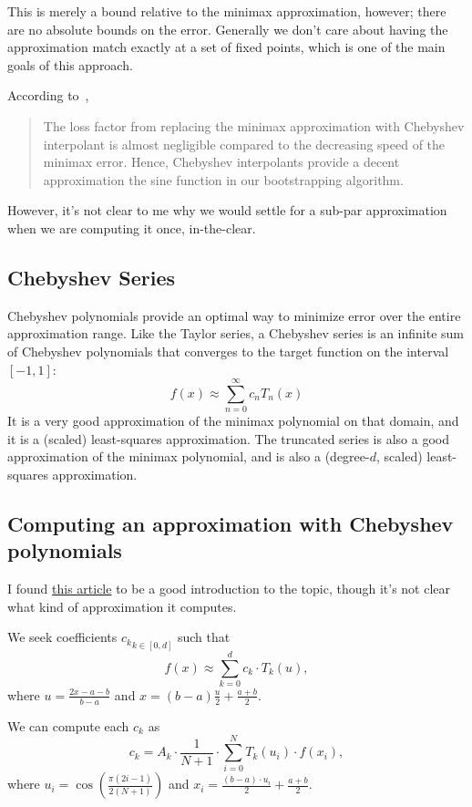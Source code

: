 \documentclass[../fheimpl.tex]{subfiles}
\begin{document}
    This is merely a bound relative to the minimax approximation, however; there are no absolute bounds on the error. Generally we don't care about having the approximation match exactly at a set of fixed points, which is one of the main goals of this approach.
    
    According to~\cite{cryptoeprint:2018/1043},
    
    \blockquote{The loss factor from replacing the minimax approximation with Chebyshev interpolant is almost negligible compared to the decreasing speed of the minimax error. Hence, Chebyshev interpolants provide a decent approximation the sine function in our bootstrapping algorithm.}
    
    However, it's not clear to me why we would settle for a sub-par approximation when we are computing it once, in-the-clear.
    
    
    \subsection{Chebyshev Series}
    Chebyshev polynomials provide an optimal way to minimize error over the entire approximation range. Like the Taylor series, a Chebyshev series is an infinite sum of Chebyshev polynomials that converges to the target function on the interval $[-1, 1]$:
    \[f(x)\approx \sum_{n=0}^\infty c_nT_n(x)\]
    It is a very good approximation of the minimax polynomial on that domain, and it is a (scaled) least-squares approximation. The truncated series is also a good approximation of the minimax polynomial, and is also a (degree-$d$, scaled) least-squares approximation.
    
    
    \subsection{Computing an approximation with Chebyshev polynomials}
    I found \href{https://www.embeddedrelated.com/showarticle/152.php}{this article} to be a good introduction to the topic, though it's not clear what kind of approximation it computes. 
    
    We seek coefficients ${c_k}_{k \in [0, d]}$ such that 
    \[f(x) \approx \sum_{k=0}^{d} c_k\cdot T_k(u),\]
    where $u = \frac{2x-a-b}{b-a}$ and $x = (b-a)\frac{u}{2}+\frac{a+b}{2}$.
    
    We can compute each $c_k$ as
    \[c_k = A_k \cdot \frac{1}{N+1} \cdot \sum_{i=0}^{N} T_k(u_i)\cdot f(x_i),\]
    where $u_i = \cos\left(\frac{\pi(2i-1)}{2(N+1)}\right)$ and $x_i = \frac{(b-a)\cdot u_i}{2}+\frac{a+b}{2}$.
    
\end{document}
